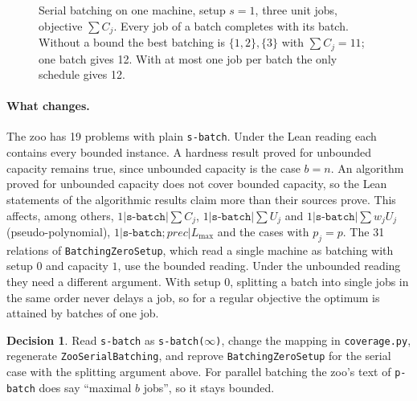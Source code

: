 \documentclass[11pt]{article}
\newcommand{\lean}[1]{\texttt{#1}}
\theoremstyle{definition}
\newtheorem{decision}{Decision}
\newcommand{\gbar}[5]{\fill[#4] (#2,#1-0.35) rectangle (#3,#1+0.35);
  \draw (#2,#1-0.35) rectangle (#3,#1+0.35); \node at ({(#2+#3)/2},#1) {\small #5};}
\newcommand{\gaxis}[2]{\draw[->] (0,#1) -- (#2+0.4,#1);
  \foreach \t in {0,...,#2} \draw (\t,#1+0.08) -- (\t,#1-0.08) node[below] {\scriptsize \t};}
\begin{document}
\begin{figure}[ht]
\centering
{}
\caption{Serial batching on one machine, setup $s=1$, three unit jobs,
objective $\sum C_j$. Every job of a batch completes with its batch. Without a
bound the best batching is $\{1,2\},\{3\}$ with $\sum C_j=11$; one batch gives
12. With at most one job per batch the only schedule gives 12.}
\label{fig:sbatch}
\end{figure}

\paragraph{What changes.} The zoo has 19 problems with plain \texttt{s-batch}.
Under the Lean reading each contains every bounded instance. A hardness result
proved for unbounded capacity remains true, since unbounded capacity is the
case $b=n$. An algorithm proved for unbounded capacity does not cover bounded
capacity, so the Lean statements of the algorithmic results claim more than
their sources prove. This affects, among others, $1|\texttt{s-batch}|\sum C_j$,
$1|\texttt{s-batch}|\sum U_j$ and $1|\texttt{s-batch}|\sum w_jU_j$
(pseudo-polynomial), $1|\texttt{s-batch};prec|L_{\max}$ and the cases with
$p_j=p$. The 31 relations of \lean{BatchingZeroSetup}, which read a
single machine as batching with setup $0$ and capacity $1$, use the bounded
reading. Under the unbounded reading they need a different argument. With
setup $0$, splitting a batch into single jobs in the same order never delays
a job, so for a regular objective the optimum is attained by batches of one
job.

\begin{decision}
Read \texttt{s-batch} as \texttt{s-batch($\infty$)}, change the mapping in
\lean{coverage.py}, regenerate \lean{ZooSerialBatching}, and reprove
\lean{BatchingZeroSetup} for the serial case with the splitting argument above.
For parallel batching the zoo's text of \texttt{p-batch} does say ``maximal
$b$ jobs'', so it stays bounded.
\end{decision}
\end{document}
